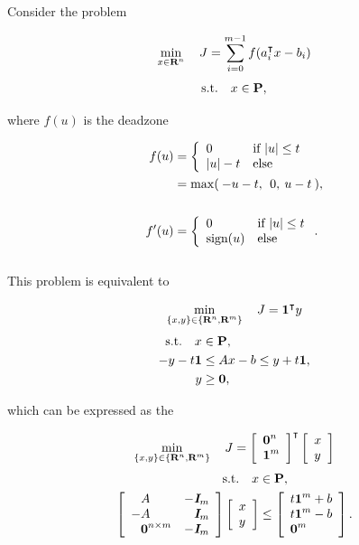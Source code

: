 \documentclass{article}
\begin{document}
    Consider the problem

    \begin{align*}
        \min_{x\in\textbf{R}^n}\quad J = \sum_{i=0}^{m-1} f(a_i^\intercal x - b_i)
    \end{align*}
    \begin{align*}
        \text{s.t.}\quad x\in\textbf{P},
    \end{align*}

    where $f(u)$ is the deadzone

    \begin{align}
        f(u) &= \left\{\begin{array}{lllllllllllllllllll}0 & \text{if $|u|\leq t$} \\ |u|-t & \text{else}\end{array}\right.\\
        &=\max(\:-u-t,\:\:0,\:u-t\:),\nonumber\\\nonumber\\
        f'(u) &= \left\{\begin{array}{lllllllllllllllllll}0 & \text{if $|u|\leq t$} \\ \text{sign}(u) & \text{else}\end{array}\right..\nonumber
    \end{align}
    \\
    This problem is equivalent to \cite[p.~344]{bv_cvxbook}

    \begin{align*}
        \min_{\{x,y\}\in\{\textbf{R}^n,\textbf{R}^m\}}\quad J = \textbf{1}^\intercal  y
    \end{align*}
    \begin{align*}
        \text{s.t.}\quad x&\in\textbf{P},\\
        -y-t\textbf{1}&\leq Ax-b\leq y+t\textbf{1},\\
        y&\geq\textbf{0},
    \end{align*}

    which can be expressed as the \LP 

    \begin{align*}
        \min_{\{x,y\}\in\{\textbf{R}^n,\textbf{R}^m\}}\quad J = \left[\begin{array}{lllllllllllllllllll}\textbf{0}^n\\\textbf{1}^m\end{array}\right]^\intercal \left[\begin{array}{lllllllllllllllllll}x\\y\end{array}\right]
    \end{align*}
    \begin{align*}
        \st\quad x&\in\poly,\\
        \mat{\minus A & -\eye_m \\ -A & \minus\eye_m \\ \minus\zeros^{n\times m} & -\eye_m}
        \mat{x\\y}
        &\leq
        \mat{t\ones^m+b\\t\ones^m-b\\\zeros^m}.
    \end{align*}
\end{document}
